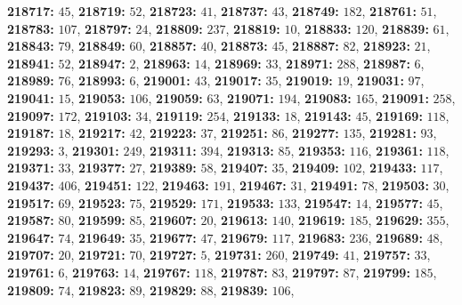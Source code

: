 \textsf{\bfseries 218717:} $45$, \textsf{\bfseries 218719:} $52$, \textsf{\bfseries 218723:} $41$, \textsf{\bfseries 218737:} $43$, \textsf{\bfseries 218749:} $182$, \textsf{\bfseries 218761:} $51$, \textsf{\bfseries 218783:} $107$, \textsf{\bfseries 218797:} $24$, \textsf{\bfseries 218809:} $237$, \textsf{\bfseries 218819:} $10$, \textsf{\bfseries 218833:} $120$, \textsf{\bfseries 218839:} $61$, \textsf{\bfseries 218843:} $79$, \textsf{\bfseries 218849:} $60$, \textsf{\bfseries 218857:} $40$, \textsf{\bfseries 218873:} $45$, \textsf{\bfseries 218887:} $82$, \textsf{\bfseries 218923:} $21$, \textsf{\bfseries 218941:} $52$, \textsf{\bfseries 218947:} $2$, \textsf{\bfseries 218963:} $14$, \textsf{\bfseries 218969:} $33$, \textsf{\bfseries 218971:} $288$, \textsf{\bfseries 218987:} $6$, \textsf{\bfseries 218989:} $76$, \textsf{\bfseries 218993:} $6$, \textsf{\bfseries 219001:} $43$, \textsf{\bfseries 219017:} $35$, \textsf{\bfseries 219019:} $19$, \textsf{\bfseries 219031:} $97$, \textsf{\bfseries 219041:} $15$, \textsf{\bfseries 219053:} $106$, \textsf{\bfseries 219059:} $63$, \textsf{\bfseries 219071:} $194$, \textsf{\bfseries 219083:} $165$, \textsf{\bfseries 219091:} $258$, \textsf{\bfseries 219097:} $172$, \textsf{\bfseries 219103:} $34$, \textsf{\bfseries 219119:} $254$, \textsf{\bfseries 219133:} $18$, \textsf{\bfseries 219143:} $45$, \textsf{\bfseries 219169:} $118$, \textsf{\bfseries 219187:} $18$, \textsf{\bfseries 219217:} $42$, \textsf{\bfseries 219223:} $37$, \textsf{\bfseries 219251:} $86$, \textsf{\bfseries 219277:} $135$, \textsf{\bfseries 219281:} $93$, \textsf{\bfseries 219293:} $3$, \textsf{\bfseries 219301:} $249$, \textsf{\bfseries 219311:} $394$, \textsf{\bfseries 219313:} $85$, \textsf{\bfseries 219353:} $116$, \textsf{\bfseries 219361:} $118$, \textsf{\bfseries 219371:} $33$, \textsf{\bfseries 219377:} $27$, \textsf{\bfseries 219389:} $58$, \textsf{\bfseries 219407:} $35$, \textsf{\bfseries 219409:} $102$, \textsf{\bfseries 219433:} $117$, \textsf{\bfseries 219437:} $406$, \textsf{\bfseries 219451:} $122$, \textsf{\bfseries 219463:} $191$, \textsf{\bfseries 219467:} $31$, \textsf{\bfseries 219491:} $78$, \textsf{\bfseries 219503:} $30$, \textsf{\bfseries 219517:} $69$, \textsf{\bfseries 219523:} $75$, \textsf{\bfseries 219529:} $171$, \textsf{\bfseries 219533:} $133$, \textsf{\bfseries 219547:} $14$, \textsf{\bfseries 219577:} $45$, \textsf{\bfseries 219587:} $80$, \textsf{\bfseries 219599:} $85$, \textsf{\bfseries 219607:} $20$, \textsf{\bfseries 219613:} $140$, \textsf{\bfseries 219619:} $185$, \textsf{\bfseries 219629:} $355$, \textsf{\bfseries 219647:} $74$, \textsf{\bfseries 219649:} $35$, \textsf{\bfseries 219677:} $47$, \textsf{\bfseries 219679:} $117$, \textsf{\bfseries 219683:} $236$, \textsf{\bfseries 219689:} $48$, \textsf{\bfseries 219707:} $20$, \textsf{\bfseries 219721:} $70$, \textsf{\bfseries 219727:} $5$, \textsf{\bfseries 219731:} $260$, \textsf{\bfseries 219749:} $41$, \textsf{\bfseries 219757:} $33$, \textsf{\bfseries 219761:} $6$, \textsf{\bfseries 219763:} $14$, \textsf{\bfseries 219767:} $118$, \textsf{\bfseries 219787:} $83$, \textsf{\bfseries 219797:} $87$, \textsf{\bfseries 219799:} $185$, \textsf{\bfseries 219809:} $74$, \textsf{\bfseries 219823:} $89$, \textsf{\bfseries 219829:} $88$, \textsf{\bfseries 219839:} $106$, 
